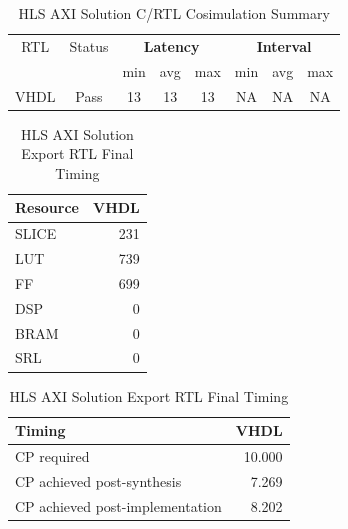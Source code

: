 \begin{table}[H]
	\centering
	\begin{tabular}{|c|c|c|c|c|c|c|c|}
		\hline
		\multicolumn{1}{|c|}{RTL} & \multicolumn{1}{|c|}{Status} & \multicolumn{3}{c|}{\textbf{Latency}} & \multicolumn{3}{c|}{\textbf{Interval}} \\
		&  & min & avg & max & min & avg & max \\
		\hline
		VHDL & Pass & 13 & 13 & 13 & NA & NA & NA \\
		\hline
	\end{tabular}
	\caption{HLS AXI Solution C/RTL Cosimulation Summary }
	\label{tab:hls-axi-solution-cosimulation-summary}
\end{table}

\begin{table}[H]
	\centering
	\begin{minipage}[t]{0.45\linewidth}
		\centering
		\begin{tabular}{|l|r|}
			\hline
			\textbf{Resource} & \textbf{VHDL} \\
			\hline
			SLICE & 231 \\
			\hline
			LUT & 739 \\
			\hline
			FF & 699 \\
			\hline
			DSP & 0 \\
			\hline
			BRAM & 0 \\
			\hline
			SRL & 0 \\
			\hline
		\end{tabular}
		\caption{HLS AXI Solution Export RTL Resource Usage}
		\label{tab:hls-axi-solution-export-rtl-resoruce-usage}
	\end{minipage}
	\hfill
	\begin{minipage}[t]{0.45\linewidth}
		\centering
		\begin{tabular}{|l|r|}
			\hline
			\textbf{Timing} & \textbf{VHDL} \\
			\hline
			CP required & 10.000 \\
			\hline
			CP achieved post-synthesis & 7.269 \\
			\hline
			CP achieved post-implementation & 8.202 \\
			\hline
		\end{tabular}
		\caption{HLS AXI Solution Export RTL Final Timing}
		\label{tab:hls-axi-solution-export-rtl-final-timing}
	\end{minipage}
\end{table}

